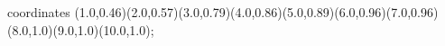 					coordinates { (1.0,0.46)(2.0,0.57)(3.0,0.79)(4.0,0.86)(5.0,0.89)(6.0,0.96)(7.0,0.96)(8.0,1.0)(9.0,1.0)(10.0,1.0)};